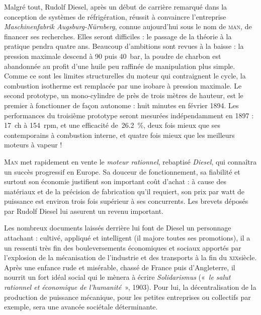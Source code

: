 	Malgré tout, Rudolf Diesel, après un début de carrière remarqué dans la conception de systèmes de réfrigération, réussit à convaincre l’entreprise \textit{Maschinenfabrik Augsburg-Nürnberg}, connue aujourd’hui sous le nom de \textsc{man}, de financer ses recherches. Elles seront difficiles : le passage de la théorie à la pratique pendra quatre ans. Beaucoup d’ambitions sont revues à la baisse : la pression maximale descend à \num{90} puis \SI{40}{\bar}, la poudre de charbon est abandonnée au profit d’une huile peu raffinée de manipulation plus simple. Comme ce sont les limites structurelles du moteur qui contraignent le cycle, la combustion isotherme est remplacée par une isobare à pression maximale. Le second prototype, un mono-cylindre de près de trois mètres de hauteur, %
	est le premier à fonctionner de façon autonome : huit minutes en février 1894. Les performances du troisième prototype %
	seront mesurées indépendamment en 1897 : \SI{17}{ch} à \SI{154}{rpm}, et une efficacité de~\SI{26,2}{\percent}, deux fois mieux que ses contemporains à combustion interne, et quatre fois mieux que les meilleurs moteurs à vapeur !
	
	\textsc{Man} met rapidement en vente le \textit{moteur rationnel}, rebaptisé \textit{Diesel}, qui connaîtra un succès progressif en Europe. Sa douceur de fonctionnement, sa fiabilité et surtout son économie justifient son important coût d’achat : à cause des matériaux et de la précision de fabrication qu’il requiert, son prix par watt de puissance est environ trois fois supérieur à ses concurrents. Les brevets déposés par Rudolf Diesel lui assurent un revenu important.
	
	Les nombreux documents laissés derrière lui font de Diesel un personnage attachant : cultivé, appliqué et intelligent (il majore toutes ses promotions), il a un ressenti très fin des bouleversements économiques et sociaux apportés par l’explosion de la mécanisation de l’industrie et des transports à la fin du \textsc{xix}\ieme siècle. %
	Après une enfance rude et misérable, chassé de France puis d’Angleterre, il nourrit un fort idéal social qui le mènera à écrire \textit{Solidarismus} («~\textit{le salut rationnel et économique de l’humanité}~», 1903). %
	Pour lui, la décentralisation de la production de puissance mécanique, pour les petites entreprises ou collectifs par exemple, sera une avancée sociétale déterminante.
	
